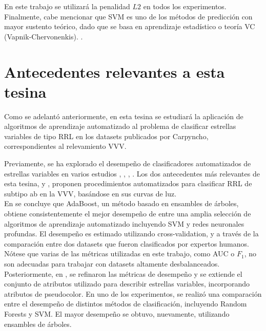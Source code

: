 En este trabajo se utilizará la penalidad $L2$ en todos los experimentos. \\

Finalmente, cabe mencionar que SVM es uno de los métodos de predicción con mayor sustento teórico, dado que se basa en aprendizaje estadístico o teoría VC (Vapnik-Chervonenkis). \cite{vapnik71uniform} \cite{vapnik74theory}.

\section{Antecedentes relevantes a esta tesina}

\par Como se adelantó anteriormente, en esta tesina se estudiará la aplicación de algoritmos de aprendizaje automatizado al problema de clasificar estrellas variables de tipo RRL en los datasets publicados por Carpyncho, correspondientes al relevamiento VVV. \\

\par Previamente, se ha explorado el desempeño de clasificadores automatizados de estrellas variables en varios estudios \cite{ej1}, \cite{ej2}, \cite{ej3}, \cite{ej4}.  Los dos antecedentes más relevantes de esta tesina, \cite{elorrieta} y \cite{jbc}, proponen procedimientos automatizados para clasificar RRL de subtipo ab en la VVV, basándose en sus curvas de luz. \\

En \cite{elorrieta} se concluye que AdaBoost\cite{adaboost}, un método basado en ensambles de árboles, obtiene consistentemente el mejor desempeño de entre una amplia selección de algoritmos de aprendizaje automatizado incluyendo SVM y redes neuronales profundas. El desempeño es estimado utilizando cross-validation, y a través de la comparación entre dos datasets que fueron clasificados por expertos humanos. Nótese que varias de las métricas utilizadas en este trabajo, como AUC o $F_1$, no son adecuadas para trabajar con datasets altamente desbalanceados. \\

Posteriormente, en \cite{jbc}, se refinaron las métricas de desempeño y se extiende el conjunto de atributos utilizado para describir estrellas variables, incorporando atributos de pseudocolor. En uno de los experimentos, se realizó una comparación entre el desempeño de distintos métodos de clasificación, incluyendo Random Forests y SVM. El mayor desempeño se obtuvo, nuevamente, utilizando ensambles de árboles.


